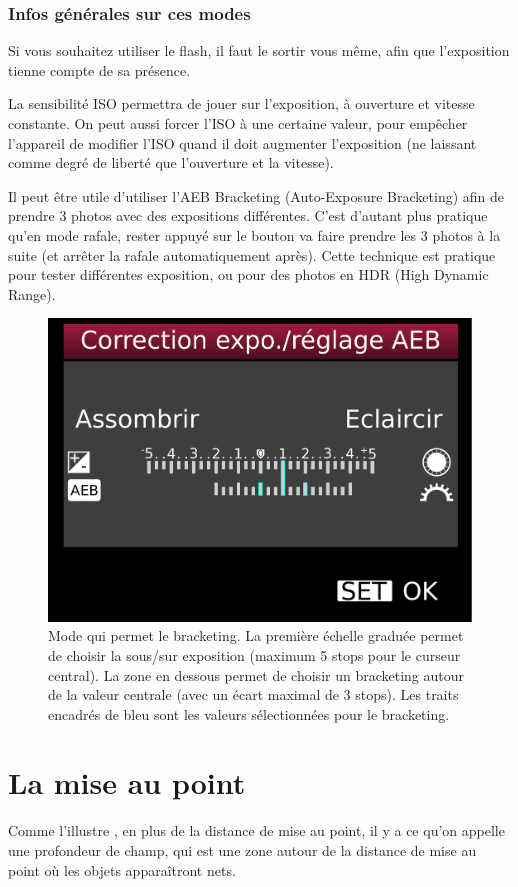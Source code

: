 \documentclass[a4paper,twoside]{article}
\begin{document}
\subsubsection{Infos générales sur ces modes}\label{sec:info-generales}
Si vous souhaitez utiliser le flash, il faut le sortir vous même, afin que l'exposition tienne compte de sa présence. 

La sensibilité ISO permettra de jouer sur l'exposition, à ouverture et vitesse constante. On peut aussi forcer l'ISO à une certaine valeur, pour empêcher l'appareil de modifier l'ISO quand il doit augmenter l'exposition (ne laissant comme degré de liberté que l'ouverture et la vitesse).

\bigskip

Il peut être utile d'utiliser l'AEB Bracketing (Auto-Exposure Bracketing) afin de prendre 3 photos avec des expositions différentes. C'est d'autant plus pratique qu'en mode rafale, rester appuyé sur le bouton va faire prendre les 3 photos à la suite (et arrêter la rafale automatiquement après). Cette technique est pratique pour tester différentes exposition, ou pour des photos en HDR (High Dynamic Range). 


\begin{figure}[htb]
\centering
\includegraphics[width=0.65\linewidth]{figure/AEB_bracketing.pdf}
\caption{Mode qui permet le bracketing. La première échelle graduée permet de choisir la sous/sur exposition (maximum 5 stops pour le curseur central). La zone en dessous permet de choisir un bracketing autour de la valeur centrale (avec un écart maximal de 3 stops). Les traits encadrés de bleu sont les valeurs sélectionnées pour le bracketing.}
\end{figure}

\section{La mise au point}
Comme l'illustre , en plus de la distance de mise au point, il y a ce qu'on appelle une profondeur de champ, qui est une zone autour de la distance de mise au point où les objets apparaîtront nets. 
\end{document}
